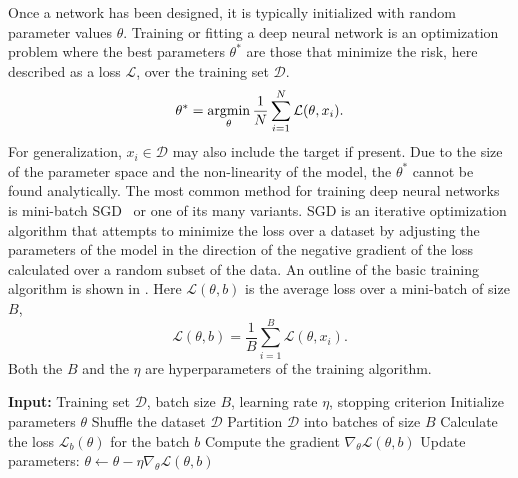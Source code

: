 Once a network has been designed, it is typically initialized with random parameter values $\theta$.
Training or fitting a deep neural network is an optimization problem where the best parameters $\theta^*$ are those that minimize the risk, here described as a loss $\mathcal{L}$, over the training set $\mathcal{D}$.
\begin{equation}
    \theta^* = \operatorname*{argmin}_{\theta} \frac{1}{N} \sum_{i=1}^N \mathcal{L}(\theta, x_i).
\end{equation}
For generalization, $x_i \in \mathcal{D}$ may also include the target if present.
Due to the size of the parameter space and the non-linearity of the model, the $\theta^*$ cannot be found analytically.
The most common method for training deep neural networks is mini-batch \Gls{SGD}~\cite{Perceptron} or one of its many variants.
\Gls{SGD} is an iterative optimization algorithm that attempts to minimize the loss over a dataset by adjusting the parameters of the model in the direction of the negative gradient of the loss calculated over a random subset of the data.
An outline of the basic training algorithm is shown in .
Here $\mathcal{L}(\theta, b)$ is the average loss over a mini-batch of size $B$,
\begin{equation}
    \mathcal{L}(\theta, b) = \frac{1}{B} \sum_{i=1}^B \mathcal{L}(\theta, x_i).
\end{equation}
Both the $B$ and the $\eta$ are hyperparameters of the training algorithm.

\begin{algorithm}
    \caption{Basic training pseudocode for minibatch stochastic gradient descent.}
    \label{alg:gradient_descent}
    \begin{algorithmic}[1]
        \State \textbf{Input:} Training set $\mathcal{D}$, batch size $B$, learning rate $\eta$, stopping criterion
        \State Initialize parameters $\theta$
        \Repeat {}
        \State Shuffle the dataset $\mathcal{D}$
        \State Partition $\mathcal{D}$ into batches of size $B$
        \State Calculate the loss $\mathcal{L}_b(\theta)$ for the batch $b$
        \State Compute the gradient $\nabla_\theta \mathcal{L}(\theta, b)$
        \State Update parameters: $\theta \gets \theta - \eta \nabla_\theta \mathcal{L}(\theta, b)$
        \EndFor
    \end{algorithmic}
\end{algorithm}

